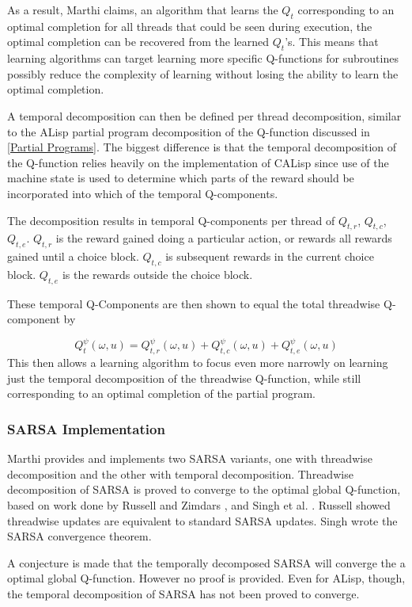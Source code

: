 \documentclass[jair,twoside,11pt,theapa]{article}
\begin{document}
As a result, Marthi claims, an algorithm that learns the $Q_t$ corresponding to an optimal completion for all threads that could be seen during execution, the optimal completion can be recovered from the learned $Q_t$'s. This means that learning algorithms can target learning more specific Q-functions for subroutines possibly reduce the complexity of learning without losing the ability to learn the optimal completion. 

A temporal decomposition can then be defined per thread decomposition, similar to the ALisp partial program decomposition of the Q-function discussed in \ref{Partial Programs}. The biggest difference is that the temporal decomposition of the Q-function relies heavily on the implementation of CALisp since use of the machine state is used to determine which parts of the reward should be incorporated into which of the temporal Q-components. 

The decomposition results in temporal Q-components per thread of $Q_{t,r}$, $Q_{t,c}$, $Q_{t,e}$. $Q_{t,r}$ is the reward gained doing a particular action, or rewards all rewards gained until a choice block. $Q_{t,c}$ is subsequent rewards in the current choice block. $Q_{t,e}$ is the rewards outside the choice block.

These temporal Q-Components are then shown to equal the total threadwise Q-component by 

\begin{equation}
Q^{\psi}_t (\omega, u) =  Q^{\psi}_{t,r} (\omega, u) + Q^{\psi}_{t,c} (\omega, u) + Q^{\psi}_{t,e} (\omega, u)
\end{equation}  
This then allows a learning algorithm to focus even more narrowly on learning just the temporal decomposition of the threadwise Q-function, while still corresponding to an optimal completion of the partial program. 


\subsubsection{SARSA Implementation}
Marthi provides and implements two SARSA variants, one with threadwise decomposition and the other with temporal decomposition. Threadwise decomposition of SARSA is proved to converge to the optimal global Q-function, based on work done by Russell and Zimdars \cite{Russell:2003}, and Singh et al. \cite{Singh}. Russell showed threadwise updates are equivalent to standard SARSA updates. Singh wrote the SARSA convergence theorem. 

A conjecture is made that the temporally decomposed SARSA will converge the a optimal global Q-function. However no proof is provided. Even for ALisp, though, the temporal decomposition of SARSA has not been proved to converge. 
\end{document}
